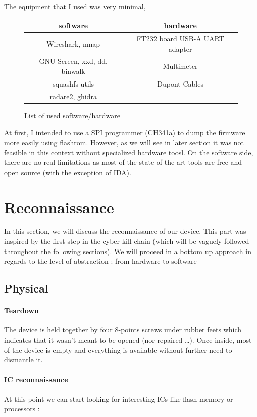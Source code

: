 \documentclass{article}
\begin{document}
\noindent The equipment that I used was very minimal,

\begin{figure}[!ht]
\begin{tabular}{|c|c|}
	\hline
	software & hardware \\
	\hline
	Wireshark, nmap & FT232 board USB-A UART adapter \\
	GNU Screen, xxd, dd, binwalk &  Multimeter \\
	squashfs-utils & Dupont Cables \\
	radare2, ghidra & \\
	\hline
\end{tabular}
\caption{List of used software/hardware}
\end{figure}


At first, I intended to use a SPI programmer (CH341a) to dump the firmware more easily using \href{https://github.com/flashrom/flashrom}{flashrom}. However, as we will see in later section it was not feasible in this context without specialized hardware toosl. On the software side, there are no real limitations as most of the state of the art tools are free and open source (with the exception of IDA).
\section{Reconnaissance}
In this section, we will discuss the reconnaissance of our device. This part was inspired by the first step in the cyber kill chain (which will be vaguely followed throughout the following sections). We will proceed in a bottom up approach in regards to the level of abstraction : from hardware to software
\subsection{Physical}
\paragraph{Teardown} The device is held together by four 8-points screws under rubber feets which indicates that it wasn't meant to be opened (nor repaired \dots). Once inside, most of the device is empty and everything is available without further need to dismantle it. 

\paragraph{IC reconnaissance} At this point we can start looking for interesting ICs like flash memory or processors :
\end{document}
